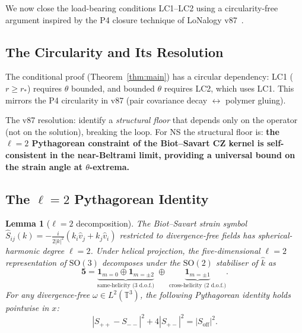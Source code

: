 \documentclass[12pt,a4paper]{article}
\newtheorem{lemma}[theorem]{Lemma}
\theoremstyle{definition}
\newcommand{\T}{\mathbb{T}}
\begin{document}
We now close the load-bearing conditions LC1--LC2 using a circularity-free
argument inspired by the P4 closure technique of LoNalogy v87~\cite{v87}.

\subsection{The Circularity and Its Resolution}

The conditional proof (Theorem~\ref{thm:main}) has a circular dependency:
LC1 ($r\ge r_*$) requires $\theta$ bounded, and bounded $\theta$ requires
LC2, which uses LC1. This mirrors the P4 circularity in v87
(pair covariance decay $\leftrightarrow$ polymer gluing).

The v87 resolution: identify a \emph{structural floor} that depends only
on the operator (not on the solution), breaking the loop.
For NS the structural floor is: \textbf{the $\ell=2$ Pythagorean constraint
of the Biot--Savart CZ kernel is self-consistent in the near-Beltrami limit,
providing a universal bound on the strain angle at $\theta$-extrema.}

\subsection{The $\ell=2$ Pythagorean Identity}

\begin{lemma}[$\ell=2$ decomposition]\label{lem:ell2}
The Biot--Savart strain symbol $\hat{S}_{ij}(k)=-\frac{i}{2|k|^2}(k_i\hat{v}_j+k_j\hat{v}_i)$
restricted to divergence-free fields has spherical-harmonic degree $\ell=2$.
Under helical projection, the five-dimensional $\ell=2$ representation of
$\mathrm{SO}(3)$ decomposes under the $\mathrm{SO}(2)$ stabiliser
of $\hat{k}$ as
\[
\mathbf{5} = \underbrace{\mathbf{1}_{m=0}\oplus\mathbf{1}_{m=\pm 2}}_{\text{same-helicity (3 d.o.f.)}}
\;\oplus\; \underbrace{\mathbf{1}_{m=\pm 1}}_{\text{cross-helicity (2 d.o.f.)}}.
\]
For any divergence-free $\omega\in L^2(\T^3)$, the following Pythagorean
identity holds pointwise in $x$:
\begin{equation}\label{eq:pythag}
\boxed{|S_{++}-S_{--}|^2 + 4|S_{+-}|^2 = |S_{\mathrm{off}}|^2.}
\end{equation}
\end{lemma}
\end{document}

